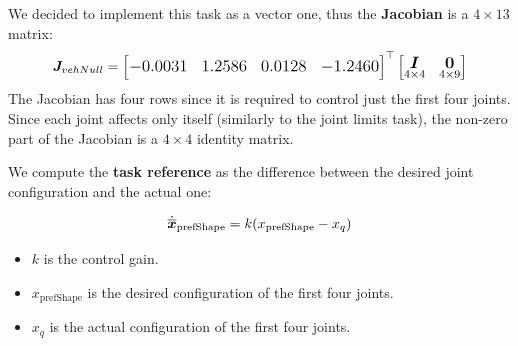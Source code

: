 \documentclass{article}
\begin{document}
We decided to implement this task as a vector one, thus the \textbf{Jacobian} is a $4\times13$ matrix:
\begin{equation}
\large
\boldsymbol{J}_{vehNull}=
\begin{bmatrix}-0.0031 & 1.2586 & 0.0128 & -1.2460 \end{bmatrix}^\top
    \begin{bmatrix}
     \underset{4\times4}{\boldsymbol{I}} & \underset{4\times9}{\boldsymbol{0}} \\
    \end{bmatrix}
\end{equation}
The Jacobian has four rows since it is required to control just the first four joints. Since each joint affects only itself (similarly to the joint limits task), the non-zero part of the Jacobian is a $4\times4$ identity matrix. 

We compute the \textbf{task reference} as the difference between the desired joint configuration and the actual one:

\begin{equation}
\large
   \dot{\overline{\boldsymbol{x}}}_{\operatorname{prefShape}} = k(x_{\operatorname{prefShape}} - x_{q}) %
\end{equation}
\begin{itemize}
    \item $k$ is the control gain.
    \item $x_{\operatorname{prefShape}}$ is the desired configuration of the first four joints.
    \item $x_{q}$ is the actual configuration of the first four joints.
\end{itemize} 
\end{document}
